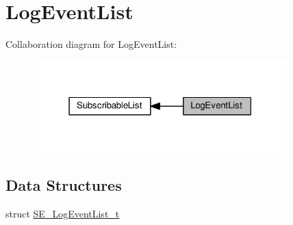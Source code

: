 \hypertarget{group__LogEventList}{}\section{Log\+Event\+List}
\label{group__LogEventList}
Collaboration diagram for Log\+Event\+List\+:\nopagebreak
\begin{figure}[H]
\begin{center}
\leavevmode
\includegraphics[width=279pt]{group__LogEventList}
\end{center}
\end{figure}
\subsection*{Data Structures}
\begin{DoxyCompactItemize}
\item 
struct \hyperlink{structSE__LogEventList__t}{S\+E\+\_\+\+Log\+Event\+List\+\_\+t}
\end{DoxyCompactItemize}
